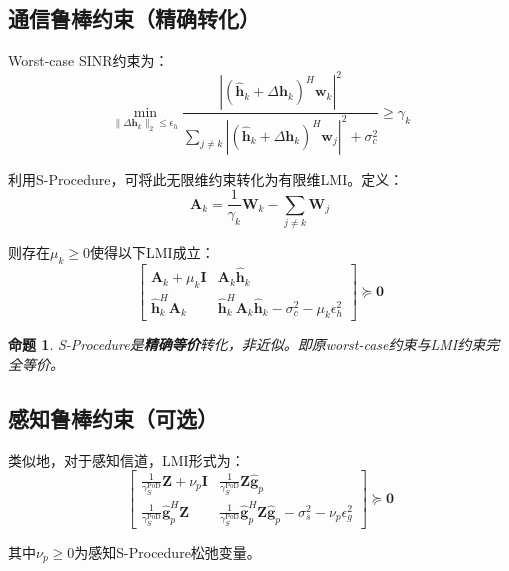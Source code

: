 \documentclass[12pt,a4paper]{article}
\newtheorem{proposition}{命题}
\newcommand{\vect}[1]{\mathbf{#1}}
\newcommand{\mat}[1]{\mathbf{#1}}
\newcommand{\norm}[1]{\|#1\|_2}
\begin{document}
\subsection{通信鲁棒约束（精确转化）}

Worst-case SINR约束为：
\begin{equation}
\min_{\norm{\Delta\vect{h}_k} \leq \epsilon_h} \frac{|(\hat{\vect{h}}_k + \Delta\vect{h}_k)^H \vect{w}_k|^2}{\sum_{j \neq k} |(\hat{\vect{h}}_k + \Delta\vect{h}_k)^H \vect{w}_j|^2 + \sigma_c^2} \geq \gamma_k
\end{equation}

利用S-Procedure，可将此无限维约束转化为有限维LMI。定义：
\begin{equation}
\mat{A}_k = \frac{1}{\gamma_k} \mat{W}_k - \sum_{j \neq k} \mat{W}_j
\end{equation}

则存在$\mu_k \geq 0$使得以下LMI成立：
\begin{equation}
\begin{bmatrix} \mat{A}_k + \mu_k \mat{I} & \mat{A}_k \hat{\vect{h}}_k \\[1.5ex] \hat{\vect{h}}_k^H \mat{A}_k & \hat{\vect{h}}_k^H \mat{A}_k \hat{\vect{h}}_k - \sigma_c^2 - \mu_k \epsilon_h^2 \end{bmatrix} \succeq \mat{0} \tag{18}
\end{equation}

\begin{proposition}
S-Procedure是\textbf{精确等价}转化，非近似。即原worst-case约束与LMI约束完全等价。
\end{proposition}

\subsection{感知鲁棒约束（可选）}

类似地，对于感知信道，LMI形式为：
\begin{equation}
\begin{bmatrix} \frac{1}{\gamma_S^{\text{PoD}}} \mat{Z} + \nu_p \mat{I} & \frac{1}{\gamma_S^{\text{PoD}}} \mat{Z} \hat{\vect{g}}_p \\[1.5ex] \frac{1}{\gamma_S^{\text{PoD}}} \hat{\vect{g}}_p^H \mat{Z} & \frac{1}{\gamma_S^{\text{PoD}}} \hat{\vect{g}}_p^H \mat{Z} \hat{\vect{g}}_p - \sigma_s^2 - \nu_p \epsilon_g^2 \end{bmatrix} \succeq \mat{0} \tag{19}
\end{equation}

其中$\nu_p \geq 0$为感知S-Procedure松弛变量。
\end{document}
